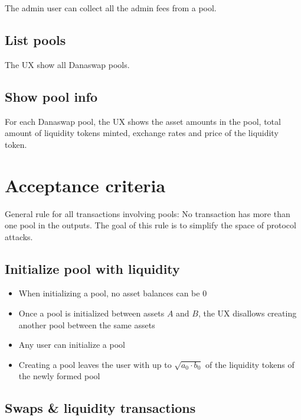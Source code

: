 \documentclass{article}
\begin{document}
The admin user can collect all the admin fees from a pool.

\subsection{List pools}

The UX show all Danaswap pools.

\subsection{Show pool info}

For each Danaswap pool, the UX shows the asset amounts in the pool, total amount
of liquidity tokens minted, exchange rates and price of the liquidity token.

\section{Acceptance criteria}

General rule for all transactions involving pools: No transaction has more than
one pool in the outputs. The goal of this rule is to simplify the space of
protocol attacks.

\subsection*{Initialize pool with liquidity}

\begin{itemize}
  \item When initializing a pool, no asset balances can be $0$
  \item Once a pool is initialized between assets $A$ and $B$, the UX disallows
    creating another pool between the same assets
  \item Any user can initialize a pool
  \item Creating a pool leaves the user with up to $\sqrt{a_0 \cdot b_0}$ of the
    liquidity tokens of the newly formed pool
\end{itemize}

\subsection*{Swaps \& liquidity transactions} \label{dex-transactions}
\end{document}
